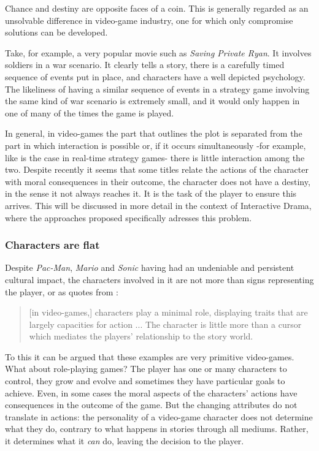 \documentclass[
		twoside,openright,titlepage,numbers=noenddot,manychapters,
		headinclude,%
                footinclude=false,cleardoublepage=empty,
                BCOR=5mm,
		fontsize=11pt, %
                 enabledeprecatedfontcommands]{scrreprt}
\begin{document}
Chance and destiny are opposite faces of a coin. This is generally regarded as an unsolvable difference in video-game industry, one for which only compromise solutions can be developed. 

Take, for example, a very popular movie such as \emph{Saving Private Ryan}. It involves soldiers in a war scenario. It clearly tells a story, there is a carefully timed sequence of events put in place, and characters have a well depicted psychology. The likeliness of having a similar sequence of events in a strategy game involving the same kind of war scenario is extremely small, and it would only happen in one of many of the times the game is played.

In general, in video-games the part that outlines the plot is separated from the part in which interaction is possible or, if it occurs simultaneously -for example, like is the case in real-time strategy games- there is little interaction among the two. Despite recently it seems that some titles relate the actions of the character with moral consequences in their outcome, the character does not have a destiny, in the sense it not always reaches it. It is the task of the player to ensure this arrives. This will be discussed in more detail in the context of Interactive Drama, where the approaches proposed specifically adresses this problem.


\subsubsection{Characters are flat}

Despite \emph{Pac-Man}, \emph{Mario} and \emph{Sonic} having had an undeniable and persistent cultural impact, the characters involved in it are not more than signs representing the player, or as \cite[page 130]{newman2004videogames} quotes from \cite[page 61]{jenkins1995nintendo}: 

\begin{quote}
[in video-games,] characters play a minimal role, displaying traits that are largely capacities for action ... The character is little more than a cursor which mediates the players' relationship to the story world.
 \end{quote}

To this it can be argued that these examples are very primitive video-games. What about role-playing games? The player has one or many characters to control, they grow and evolve and sometimes they have particular goals to achieve. Even, in some cases the moral aspects of the characters' actions have consequences in the outcome of the game.  But the changing attributes do not translate in actions: the personality of a video-game character does not determine what they do, contrary to what happens in stories through all mediums. Rather, it determines what it \emph{can} do, leaving the decision to the player. 
\end{document}
